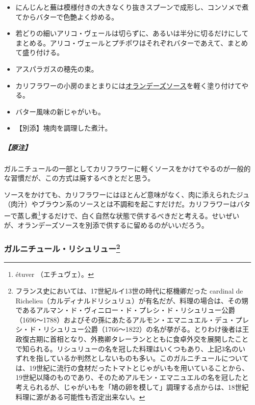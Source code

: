 \begin{recette}
\begin{itemize}
\item
  にんじんと蕪は模様付きの大きなくり抜きスプーンで成形し、コンソメで煮てからバターで色艶よく炒める。
\item
  若どりの細いアリコ・ヴェールは切らずに、あるいは半分に切るだけにしてまとめる。アリコ・ヴェールとプチポワはそれぞれバターであえて、まとめて盛り付ける。
\item
  アスパラガスの穂先の束。
\item
  カリフラワーの小房のまとまりには\protect\hyperlink{sauce-hollandaise}{オランデーズソース}を軽く塗り付けてやる。
\item
  バター風味の新じゃがいも。
\item
  【別添】塊肉を調理した煮汁。
\end{itemize}

\hypertarget{ux539fux6ce8-1}{%
\subparagraph{【原注】}\label{ux539fux6ce8-1}}

ガルニチュールの一部としてカリフラワーに軽くソースをかけてやるのが一般的な習慣だが、この方式は廃するべきとだと思う。

ソースをかけても、カリフラワーにはほとんど意味がなく、肉に添えられたジュ（肉汁）やブラウン系のソースとは不調和を起こすだけだ。カリフラワーはバターで蒸し煮\footnote{étuver
  （エチュヴェ）。}するだけで、白く自然な状態で供するべきだと考える。せいぜいが、オランデーズソースを別添で供するに留めるのがいいだろう。

\atoaki{}

\hypertarget{garniture-richelieu}{%
\subsubsection[ガルニチュール・リシュリュー]{\texorpdfstring{ガルニチュール・リシュリュー\footnote{フランス史においては、17世紀ルイ13世の時代に枢機卿だった
  cardinal de
  Richelieu（カルディナルドリシュリュ）が有名だが、料理の場合は、その甥であるアルマン・ド・ヴィニロー・ド・プレシ・ド・リシュリュー公爵（1696〜1788）およびその孫にあたるアルモン・エマニュエル・デュ・プレシ・ド・リシュリュー公爵（1766〜1822）の名が挙がる。とりわけ後者は王政復古期に首相となり、外務卿タレーランとともに食卓外交を展開したことで知られる。リシュリューの名を冠した料理はいくつもあり、上記3名のいずれを指しているか判然としないものも多い。このガルニチュールについては、19世紀に流行の食材だったトマトとじゃがいもを用いていることから、19世紀以降のものであり、そのためアルモン・エマニュエルの名を冠したと考えられるが、じゃがいもを「鳩の卵を模して」調理する点からは、18世紀料理に源がある可能性も否定出来ない。}}{ガルニチュール・リシュリュー}}\label{garniture-richelieu}}


\end{recette}
